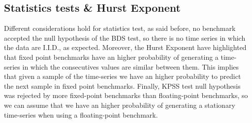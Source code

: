 \subsection{Statistics tests \& Hurst Exponent}
Different considerations hold for statistics test, as said before, no benchmark accepted the null hypothesis of the BDS test, so there is no time series in which the data are I.I.D., as expected.
Moreover, the Hurst Exponent have highlighted that fixed point benchmarks have an higher probability of generating a time-series in which the consecutives values are similar between them. This implies that given a sample of the time-series we have an higher probability to predict the next sample in fixed point benchmarks.\newline
Finally, KPSS test null hypothesis was rejected by more fixed-point benchmarks than floating-point benchmarks, so we can assume that we have an higher probability of generating a stationary time-series when using a floating-point benchmark.

